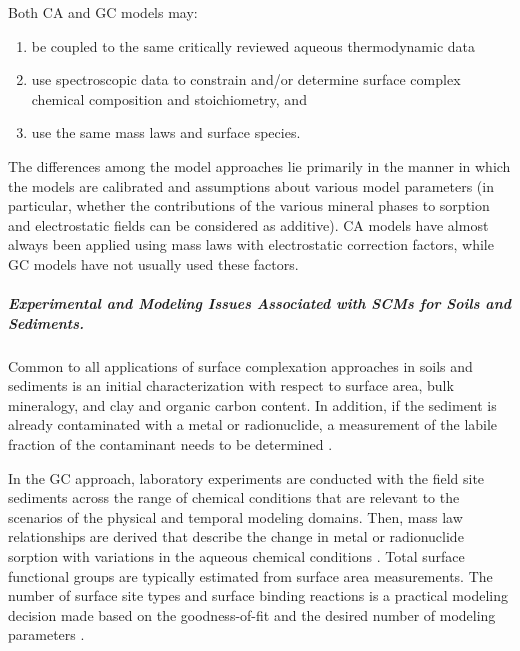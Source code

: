 Both CA and GC models may: 
\begin{enumerate}
\item be coupled to the same critically reviewed aqueous thermodynamic data
\item use spectroscopic data to constrain and/or determine surface complex chemical composition and stoichiometry, and 
\item use the same mass laws and surface species. 
\end{enumerate}
The differences among the model approaches lie primarily in the manner in which the models are calibrated and assumptions about various model parameters (in particular, whether the contributions of the various mineral phases to sorption and electrostatic fields can be considered as additive). CA models have almost always been applied using mass laws with electrostatic correction factors, while GC models have not usually used these factors.

\subparagraph{Experimental and Modeling Issues Associated with SCMs for Soils and Sediments.}

Common to all applications of surface complexation approaches in soils
and sediments is an initial characterization with respect to surface
area, bulk mineralogy, and clay and organic carbon content.  In
addition, if the sediment is already contaminated with a metal or
radionuclide, a measurement of the labile fraction of the contaminant
needs to be determined \citep{kohler-2004, curtis-2004, bond-2008}.

In the GC approach, laboratory experiments are conducted with the field site sediments across the range of chemical conditions that are relevant to the scenarios of the physical and temporal modeling domains. Then, mass law relationships are derived that describe the change in metal or radionuclide sorption with variations in the aqueous chemical conditions \citep{davis-2004}.  Total surface functional groups are typically estimated from surface area measurements.  The number of surface site types and surface binding reactions is a practical modeling decision made based on the goodness-of-fit and the desired number of modeling parameters \citep{hyun-2009}.

